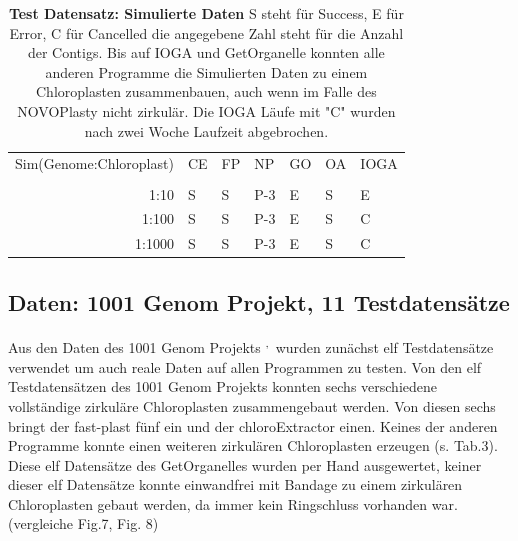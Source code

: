 \documentclass{scrartcl}
\begin{document}
\begin{table}[!h]
\caption[Test Datensatz: Simulierte Daten]{\textbf{Test Datensatz: Simulierte Daten} S steht für Success, E für Error, C für Cancelled die angegebene Zahl steht für die Anzahl der Contigs. Bis auf IOGA und GetOrganelle konnten alle anderen Programme die Simulierten Daten zu einem Chloroplasten zusammenbauen, auch wenn im Falle des NOVOPlasty nicht zirkulär. Die IOGA Läufe mit "C" wurden nach zwei Woche Laufzeit abgebrochen.}
\begin{center}
\begin{tabular}{rllllll}
Sim(Genome:Chloroplast) & CE & FP & NP & GO & OA & IOGA\\
 &  &  &  &  &  & \\
\hline
1:10 & S & S & P-3 & E & S & E\\
1:100 & S & S & P-3 & E & S & C\\
1:1000 & S & S & P-3 & E & S & C\\
\end{tabular}
\end{center}
\end{table}

\subsection{Daten: 1001 Genom Projekt, 11 Testdatensätze}
\label{sec-4-3}
Aus den Daten des 1001 Genom Projekts \footnotemark[41]{}\textsuperscript{,}\,\footnotemark[7]{} wurden zunächst elf Testdatensätze verwendet um auch reale Daten auf allen Programmen zu testen.
Von den elf Testdatensätzen des 1001 Genom Projekts konnten sechs verschiedene vollständige zirkuläre Chloroplasten zusammengebaut werden. Von diesen
sechs bringt der fast-plast fünf ein und der chloroExtractor einen. Keines der anderen Programme konnte einen weiteren 
zirkulären Chloroplasten erzeugen (s. Tab.3). Diese elf Datensätze des GetOrganelles wurden per Hand ausgewertet, keiner dieser elf Datensätze konnte einwandfrei mit Bandage
zu einem zirkulären Chloroplasten gebaut werden, da immer kein Ringschluss vorhanden war. (vergleiche Fig.7, Fig. 8)
\end{document}
